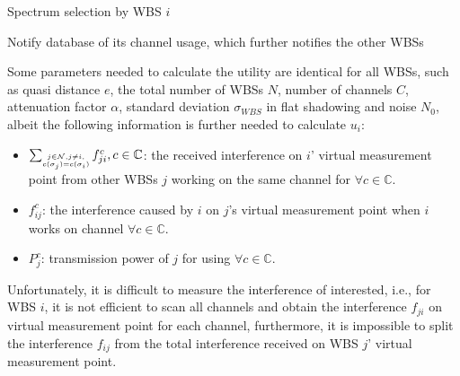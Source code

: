 \documentclass[times]{ettauth}
\newcommand{\ie}{i.e., }
\theoremstyle{mytheoremstyle}
\theoremstyle{mytheoremstyle}
\theoremstyle{mytheoremstyle}
\begin{document}
\begin{algorithm}[h]
\caption{Spectrum selection by WBS $i$}          %
\label{whitecatalgo} 
\DontPrintSemicolon
\SetAlgoLined
{}

	
Notify database of its channel usage, which further notifies the other WBSs

\end{algorithm}





Some parameters needed to calculate the utility are identical for all WBSs, such as quasi distance $e$, the total number of WBSs $N$, number of channels $C$, attenuation factor $\alpha$, standard deviation $\sigma_{WBS}$ in flat shadowing and noise $N_0$, albeit the following information is further needed to calculate $u_i$: 
	\begin{itemize} %
	\item $\sum_{\tiny\substack{j\in \mathcal{N}, j\ne i,\\ c(\sigma_j)=c(\sigma_i)}}f_{ji}^c, c\in \mathbb{C}$: the received interference on $i$' virtual measurement point from other WBSs $j$ working on the same channel for $\forall c\in \mathbb{C}$.
	\item $ f_{ij}^c$: the interference caused by $i$ on $j$'s virtual measurement point when $i$ works on channel $\forall c\in \mathbb{C}$.
	\item $P_j^c$: transmission power of $j$ for using $\forall c\in \mathbb{C}$.
	\end{itemize}
Unfortunately, it is difficult to measure the interference of interested, \ie for WBS $i$, it is not efficient to scan all channels and obtain the interference $f_{ji}$ on virtual measurement point for each channel, furthermore, it is impossible to split the interference $f_{ij}$ from the total interference received on WBS $j$' virtual measurement point. 
\end{document}
